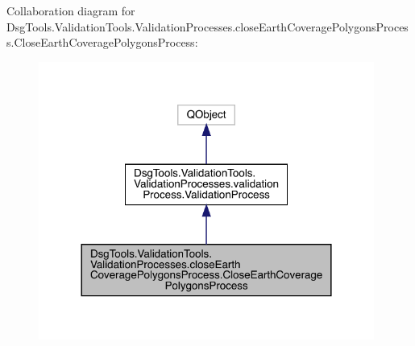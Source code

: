 Collaboration diagram for Dsg\+Tools.\+Validation\+Tools.\+Validation\+Processes.\+close\+Earth\+Coverage\+Polygons\+Process.\+Close\+Earth\+Coverage\+Polygons\+Process\+:
\nopagebreak
\begin{figure}[H]
\begin{center}
\leavevmode
\includegraphics[width=312pt]{class_dsg_tools_1_1_validation_tools_1_1_validation_processes_1_1close_earth_coverage_polygons_p9acff3a8ef2739bfc79ae501f30b1042}
\end{center}
\end{figure}
